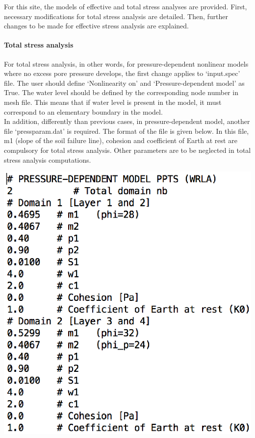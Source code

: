 For this site, the models of effective and total stress analyses are provided. First, necessary modifications for total stress analysis are detailed. Then, further changes to be made for effective stress analysis are explained. \\

\paragraph{Total stress analysis}

For total stress analysis, in other words, for pressure-dependent nonlinear models where no excess pore pressure develops, the first change applies to ‘input.spec’ file. The user should define ‘Nonlinearity on’ and ‘Pressure-dependent model’ as True. The water level should be defined by the corresponding node number in mesh file. This means that if water level is present in the model, it must correspond to an elementary boundary in the model.  \\

In addition, differently than previous cases, in pressure-dependent model, another file ‘pressparam.dat’ is required. The format of the file is given below.  In this file, m1 (slope of the soil failure line), cohesion and coefficient of Earth at rest are compulsory for total stress analysis. Other parameters are to be neglected in total stress analysis computations. \\

\begin{center}
\leavevmode
\includegraphics [scale=0.75] {figures/pressparamdat.eps} 
\label{press} 
\vspace{1cm}
\end{center}


